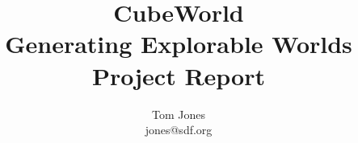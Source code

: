 \title{CubeWorld\\Generating Explorable Worlds\\Project Report}
\author{Tom Jones\\jones@sdf.org}
\maketitle

